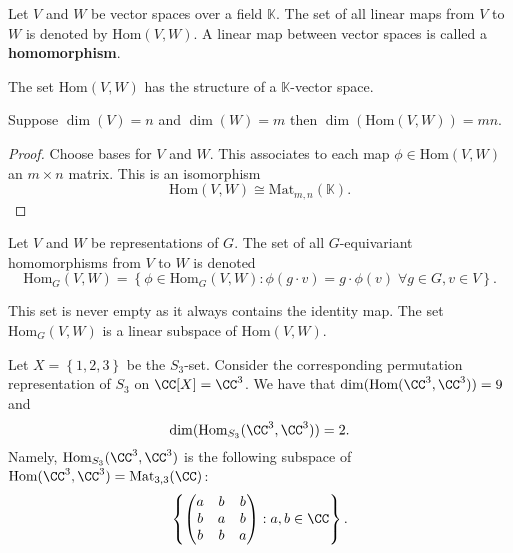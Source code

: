 \documentclass[12pt, a4paper]{article}
\newcommand{\KK}{\mathbb{K}}
\newcommand{\mat}{\text{Mat}}
\begin{document}
\begin{definition}
    Let \(V\) and \(W\) be vector spaces over a field \(\KK\). The set of all linear maps from \(V\) to \(W\) is denoted by \(\text{Hom}(V,W)\). A linear map between vector spaces is called a \textbf{homomorphism}. 
\end{definition}

\begin{mdprop}
    The set \(\text{Hom}(V,W)\) has the structure of a \(\KK\)-vector space.
\end{mdprop}

\begin{proposition}
    Suppose \(\dim(V)=n\) and \(\dim(W)=m\) then \(\dim(\text{Hom}(V,W))=mn\).
\end{proposition}

\begin{proof}
    Choose bases for \(V\) and \(W\). This associates to each map \(\phi\in \text{Hom}(V,W)\) an \(m\times n\) matrix. This is an isomorphism 
    \[\text{Hom}(V,W) \cong \mat_{m,n}(\KK).\]
\end{proof}

\begin{definition}
    Let \(V\) and \(W\) be representations of \(G\). The set of all \(G\)-equivariant homomorphisms from \(V\) to \(W\) is denoted 
    \[\text{Hom}_G(V,W) = \left\{ \phi \in \text{Hom}_G(V,W) : \phi(g\cdot v)=g\cdot \phi(v) \; \forall g\in G,v\in V \right\}.\]
\end{definition}

\begin{mdremark}
    This set is never empty as it always contains the identity map. The set \(\text{Hom}_G(V,W)\) is a linear subspace of \(\text{Hom}(V,W)\).
\end{mdremark}

\begin{example}
    Let \(X = \left\{ 1,2,3 \right\}\)  be the \(S_3\)-set. Consider the corresponding permutation representation of \(S_3\) on \(\CC[X] = \CC^3\). We have that \(\dim(\text{Hom}(\CC^3,\CC^3))=9\) and 
    \[\dim(\text{Hom}_{S_3}(\CC^3,\CC^3))=2.\]
    Namely, \(\text{Hom}_{S_3}(\CC^3,\CC^3)\) is the following subspace of \(\text{Hom}(\CC^3,\CC^3) =\mat_{3,3}(\CC)\):
    \[\left\{ \begin{pmatrix}
        a & b & b \\
        b & a & b \\
        b & b & a 
    \end{pmatrix} : a,b \in \CC\right\}.\]
\end{example}
\end{document}
